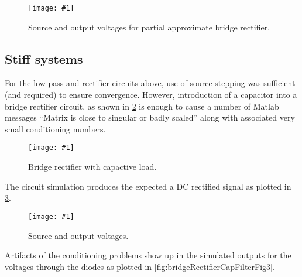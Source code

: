 \documentclass[12pt,journal,compsoc]{../ieeepaper/IEEEtran}
\newcommand{\imageFigureHere}[4]{%
\begin{figure}[!h]%
\centering%
\texttt{[image: \#1]}%
\caption{#2}%
\label{#3}%
\end{figure}%
}
\begin{document}
\imageFigureHere{../../figures/ece1254/report/bridgeRectifierPowSourceAndOutputVoltagesFig2}{Source and output voltages for partial approximate bridge rectifier.}{fig:bridgeRectifierPowSourceAndOutputVoltagesFig2}{3.0in}

\subsection{Stiff systems}

For the low pass and rectifier circuits above, use of source stepping was sufficient (and required) to ensure convergence.  However, introduction of a capacitor into a bridge rectifier circuit, as shown in \cref{fig:bridgeRectifierCapFilterFig1} is enough to cause a number of Matlab messages ``Matrix is close to singular or badly scaled'' along with associated very small conditioning numbers.

\imageFigureHere{../../figures/ece1254/report/bridgeRectifierCapFilterFig1}{Bridge rectifier with capactive load.}{fig:bridgeRectifierCapFilterFig1}{4.0in}


The circuit simulation produces the expected a DC rectified signal as plotted in \cref{fig:bridgeRectifierCapFilterFig2}.

\imageFigureHere{../../figures/ece1254/report/bridgeRectifierCapFilterSourceAndOutputVoltagesFig2}{Source and output voltages.}{fig:bridgeRectifierCapFilterFig2}{3.0in}

Artifacts of the conditioning problems show up in the simulated outputs for the voltages through the diodes as plotted in \cref{fig:bridgeRectifierCapFilterFig3}.
\end{document}
